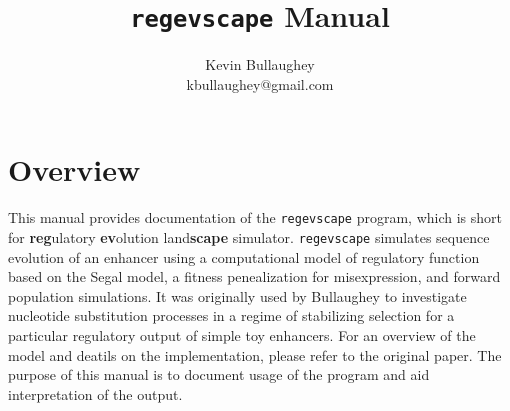\documentclass[12pt]{article}
\author{Kevin Bullaughey \\ \normalsize{kbullaughey@gmail.com}}
\title{\texttt{regevscape} Manual}
\begin{document}
\maketitle

\section*{Overview}

This manual provides documentation of the \texttt{regevscape} program, which is short for \textbf{reg}ulatory \textbf{ev}olution land\textbf{scape} simulator. \texttt{regevscape} simulates sequence evolution of an enhancer using a computational model of regulatory function based on the Segal model\cite{Segal:2008fk}, a fitness penealization for misexpression, and forward population simulations. It was originally used by Bullaughey\cite{KLBullaughey11232010} to investigate nucleotide substitution processes in a regime of stabilizing selection for a particular regulatory output of simple toy enhancers. For an overview of the model and deatils on the implementation, please refer to the original paper\cite{KLBullaughey11232010}. The purpose of this manual is to document usage of the program and aid interpretation of the output.


\end{document}
